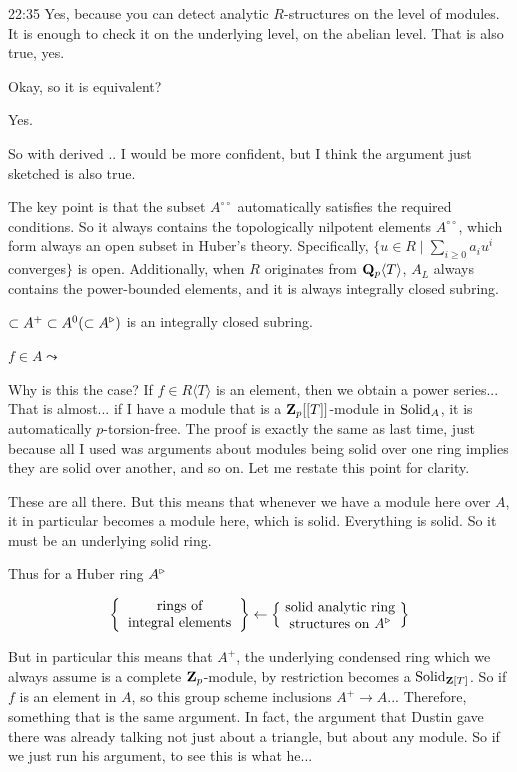 \begin{unfinished}{22:35}
\ans Yes, because you can detect analytic $R$-structures on the level of modules. It is enough to check it on the underlying level, on the abelian  level. That is also true, yes. 

\ques Okay, so it is equivalent?

\ans Yes.

So with derived ..  I would be more confident, but I think the argument just sketched is also true.

The key point is that the subset $A^{\circ \circ}$ automatically satisfies the required conditions.
So it always contains the topologically nilpotent elements $A^{\circ \circ}$, which form always an open subset in Huber's theory. Specifically, $\{u\in R\mid \sum_{i\geq 0} a_i u^i$ converges$\}$ is open. 
Additionally, when $R$ originates from $\mathbf Q_p\langle T \rangle$, $A_L$ always contains the power-bounded elements, and it is always integrally closed subring. 

\bp
$ \subset A^{+} \subset A^{0} (\subset A^{\triangleright}) $ is an integrally closed subring.
\ep

\bq
$f \in A \leadsto $
\eq

%
Why is this the case? If $f\in R\langle T \rangle$ is an element, then we obtain a power series... 
That is almost... if I have a module that is a $\mathbf Z_p[[T]]$-module in $\mathrm{Solid}_A$, it is automatically $p$-torsion-free. 
The proof is exactly the same as last time, just because all I used was arguments about modules being solid over one ring implies they are solid over another, and so on. 
Let me restate this point for clarity.

These are all there. But this means that whenever we have a module here over $A$, it in particular becomes a module here, which is solid. Everything is solid. So it must be an underlying solid ring.


Thus for a Huber ring $A^\triangleright$

\[
\left\{ \parbox{3cm}{\centering rings of \\ integral elements} \right\} \leftarrow \left\{ \parbox{3cm}{\centering solid analytic ring \\ structures on $A^{\tri}$} \right\}
\]

%
But in particular this means that $A^+$, the underlying condensed ring which we always assume is a complete $\mathbf Z_p$-module, by restriction becomes a $\mathrm{Solid}_{\mathbf Z[T]}$. So if $f$ is an element in $A$, so this group scheme inclusions $A^+\to A$... 
Therefore, something that is the same argument. 
In fact, the argument that Dustin gave there was already talking not just about a triangle, but about any module.  So if we just run his argument, to see this is what he...


\end{unfinished}
